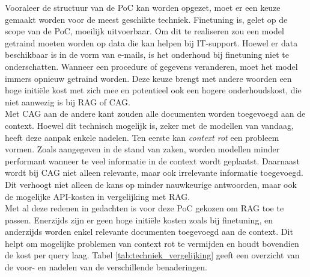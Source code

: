 Vooraleer de structuur van de PoC kan worden opgezet, moet er een keuze gemaakt worden voor de meest geschikte techniek. Finetuning is, gelet op de scope van de PoC, moeilijk uitvoerbaar. Om dit te realiseren zou een model getraind moeten worden op data die kan helpen bij IT-support. Hoewel er data beschikbaar is in de vorm van e-mails, is het onderhoud bij finetuning niet te onderschatten. Wanneer een procedure of gegevens veranderen, moet het model immers opnieuw getraind worden. Deze keuze brengt met andere woorden een hoge initiële kost met zich mee en potentieel ook een hogere onderhoudskost, die niet aanwezig is bij RAG of CAG.
\\[1em]
Met CAG aan de andere kant zouden alle documenten worden toegevoegd aan de context. Hoewel dit technisch mogelijk is, zeker met de modellen van vandaag, heeft deze aanpak enkele nadelen. Ten eerste kan \textit{context rot} een probleem vormen. Zoals aangegeven in de stand van zaken, worden modellen minder performant wanneer te veel informatie in de context wordt geplaatst. Daarnaast wordt bij CAG niet alleen relevante, maar ook irrelevante informatie toegevoegd. Dit verhoogt niet alleen de kans op minder nauwkeurige antwoorden, maar ook de mogelijke API-kosten in vergelijking met RAG.
\\[1em]
Met al deze redenen in gedachten is voor deze PoC gekozen om RAG toe te passen. Enerzijds zijn er geen hoge initiële kosten zoals bij finetuning, en anderzijds worden enkel relevante documenten toegevoegd aan de context. Dit helpt om mogelijke problemen van context rot te vermijden en houdt bovendien de kost per query laag. Tabel \ref{tab:techniek_vergelijking} geeft een overzicht van de voor- en nadelen van de verschillende benaderingen.

\begin{table}[H]
    \caption{Vergelijking van voor- en nadelen van finetuning, CAG en RAG}
    \label{tab:techniek_vergelijking}
\end{table}


